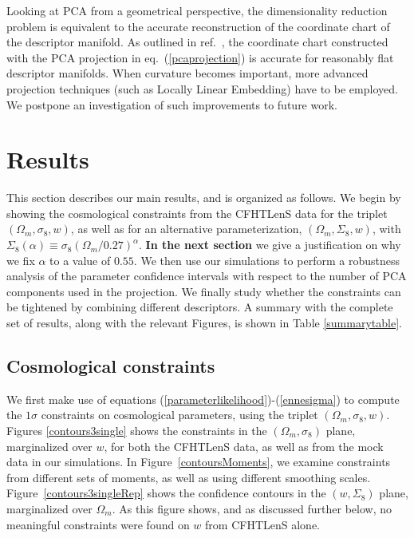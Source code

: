 \documentclass[reprint,aps,prd,superscriptaddress,showkeys,showpacs]{revtex4-1}
\begin{document}
Looking at PCA from a geometrical perspective, the dimensionality
reduction problem is equivalent to the accurate reconstruction of the
coordinate chart of the descriptor manifold. As outlined in
ref.~\citep{astroMLText}, the coordinate chart constructed with the
PCA projection in eq.~(\ref{pcaprojection}) is accurate for reasonably
flat descriptor manifolds. When curvature becomes important, more
advanced projection techniques (such as Locally Linear Embedding) have
to be employed.  We postpone an investigation of such improvements to
future work.




\section{Results}
\label{results}

This section describes our main results, and is organized as follows.
We begin by showing the cosmological constraints from the CFHTLenS
data for the triplet $(\Omega_m,\sigma_8,w)$, as well as for an
alternative parameterization, $(\Omega_m,\Sigma_8,w)$, with
$\Sigma_8(\alpha)\equiv \sigma_8(\Omega_m/0.27)^\alpha$. \textbf{In the next section} we give a justification on why we fix $\alpha$ to a value of $0.55$. 
We then use our simulations to perform a robustness analysis of the parameter
confidence intervals with respect to the number of PCA components used
in the projection.
We finally study whether the constraints can be tightened by combining
different descriptors. A summary with the complete set of results,
along with the relevant Figures, is shown in Table \ref{summarytable}.



\subsection{Cosmological constraints}
We first make use of equations
(\ref{parameterlikelihood})-(\ref{ennesigma}) to compute the $1\sigma$
constraints on cosmological parameters, using the triplet
$(\Omega_m,\sigma_8,w)$.  Figures \ref{contours3single} shows the
constraints in the $(\Omega_m,\sigma_8)$ plane, marginalized over $w$,
for both the CFHTLenS data, as well as from the mock data in our
simulations.  In Figure~\ref{contoursMoments}, we examine constraints
from different sets of moments, as well as using different smoothing
scales.  Figure~\ref{contours3singleRep} shows the confidence contours
in the $(w,\Sigma_8)$ plane, marginalized over $\Omega_m$. As this
figure shows, and as discussed further below, no meaningful
constraints were found on $w$ from CFHTLenS alone.
\end{document}
